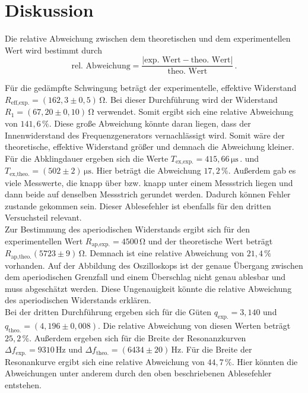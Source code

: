 \section{Diskussion}
\label{sec:Diskussion}
Die relative Abweichung zwischen dem theoretischen und dem experimentellen Wert wird bestimmt durch
$$\text{rel. Abweichung} = \frac{|\text{exp. Wert} - \text{theo. Wert}|}{\text{theo. Wert}}\,.$$

Für die gedämpfte Schwingung beträgt der experimentelle, effektive Widerstand $R_{\text{eff,exp.}} = \left(162,3 \pm 0,5\right)\,\unit{\ohm}$.
Bei dieser Durchführung wird der Widerstand $R_1 = \left(67,20 \pm 0,10\right)\,\unit{\ohm}$ verwendet. Somit ergibt sich eine relative Abweichung 
von $141,6\,\%$. Diese große Abweichung könnte daran liegen, dass der Innenwiderstand des Frequenzgenerators vernachlässigt wird. Somit wäre 
der theoretische, effektive Widerstand größer und demnach die Abweichung kleiner. Für die Abklingdauer ergeben sich die Werte $T_{\text{ex,exp.}}= 415,66\,\unit{\micro\second}\,.$ und
$T_{\text{ex,theo.}}= \left(502\pm2\right)\,\unit{\micro\second}$. Hier beträgt die Abweichung $17,2\,\%$. Außerdem gab es viele Messwerte, die knapp über bzw. knapp unter einem Messstrich
liegen und dann beide auf denselben Messstrich gerundet werden. Dadurch können Fehler zustande gekommen sein. Dieser Ablesefehler ist ebenfalls für den dritten 
Versuchsteil relevant. \\
Zur Bestimmung des aperiodischen Widerstands ergibt sich für den experimentellen Wert $R_{\text{ap,exp.}} = 4500 \,\unit{\ohm}$ und der theoretische
Wert beträgt $R_{\text{ap,theo.}}\left(5723\pm9\right)\,\unit{\ohm}$. Demnach ist eine relative Abweichung von $21,4\,\%$ vorhanden. Auf der Abbildung des Oszilloskops
ist der genaue Übergang zwischen dem aperiodischen Grenzfall und einem Überschlag nicht genau ablesbar und muss abgeschätzt werden. Diese Ungenauigkeit könnte die relative Abweichung 
des aperiodischen Widerstands erklären.\\
Bei der dritten Durchführung ergeben sich für die Güten $q_{\text{exp.}} = 3,140 $ und $q_{\text{theo.}} =\left(4,196\pm0,008\right)$. Die relative Abweichung
von diesen Werten beträgt $25,2\,\%$. Außerdem ergeben sich für die Breite der Resonanzkurven $\Delta f_{\text{exp.}} =9310\,\unit{\hertz}$ und
$\Delta f_{\text{theo.}} =\left(6434\pm20\right)\,\unit{\hertz}$. Für die Breite der Resonankurve ergibt sich eine relative Abweichung von $44,7\,\%$.
Hier könnten die Abweichungen unter anderem durch den oben beschriebenen Ablesefehler entstehen. 

